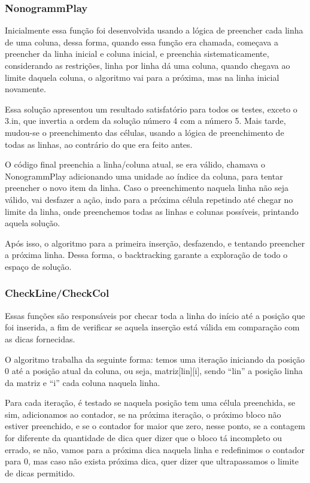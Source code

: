 \documentclass{article}
\begin{document}
\subsubsection{NonogrammPlay}

Inicialmente essa função foi desenvolvida usando a lógica de preencher cada linha de uma coluna, dessa forma, quando essa função era chamada, começava a preencher da linha inicial e coluna inicial, e preenchia sistematicamente, considerando as restrições, linha por linha dá uma coluna, quando chegava ao limite daquela coluna, o algoritmo vai para a próxima, mas na linha inicial novamente.

Essa solução apresentou um resultado satisfatório para todos os testes, exceto o 3.in, que invertia a ordem da solução número 4 com a número 5. Mais tarde, mudou-se o preenchimento das células, usando a lógica de preenchimento de todas as linhas, ao contrário do que era feito antes. 

O código final preenchia a linha/coluna atual, se era válido, chamava o NonogrammPlay adicionando uma unidade ao índice da coluna, para tentar preencher o novo item da linha. Caso o preenchimento naquela linha não seja válido, vai desfazer a ação, indo para a próxima célula repetindo até chegar no limite da linha, onde preenchemos todas as linhas e colunas possíveis, printando aquela solução.

Após isso, o algoritmo para a primeira inserção, desfazendo, e tentando preencher a próxima linha. Dessa forma, o backtracking garante a exploração de todo o espaço de solução.


\subsubsection{CheckLine/CheckCol}

Essas funções são responsáveis por checar toda a linha do início até a posição que foi inserida, a fim de verificar se aquela inserção está válida em comparação com as dicas fornecidas.

O algoritmo trabalha da seguinte forma: temos uma iteração iniciando da posição 0 até a posição atual da coluna, ou seja, matriz[lin][i], sendo “lin” a posição linha da matriz e “i” cada coluna naquela linha.

Para cada iteração, é testado se naquela posição tem uma célula preenchida, se sim, adicionamos ao contador, se na próxima iteração, o próximo bloco não estiver preenchido, e se o contador for maior que zero, nesse ponto, se a contagem for diferente da quantidade de dica quer dizer que o bloco tá incompleto ou errado, se não, vamos para a próxima dica naquela linha e redefinimos o contador para 0, mas caso não exista próxima dica, quer dizer que ultrapassamos o limite de dicas permitido.
\end{document}
